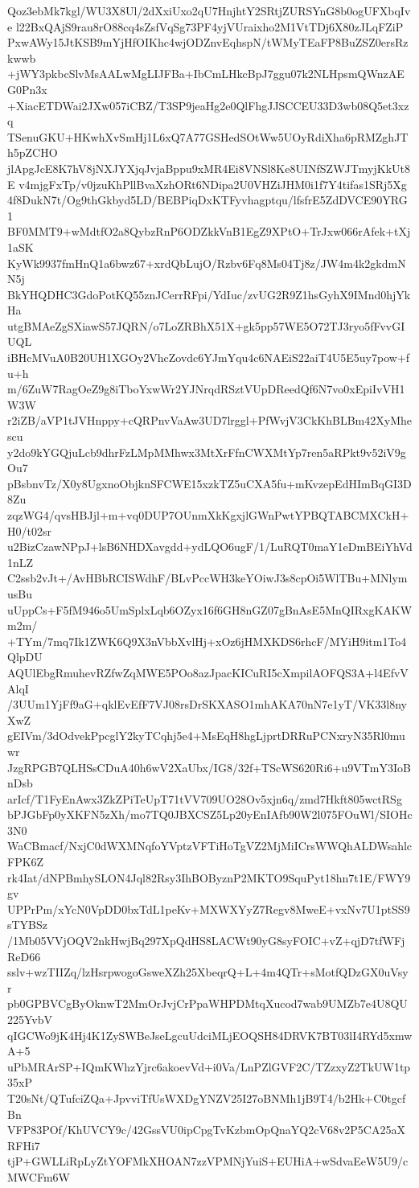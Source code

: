 Qoz3ebMk7kgl/WU3X8Ul/2dXxiUxo2qU7HnjhtY2SRtjZURSYnG8b0ogUFXbqIve
l22BxQAjS9rau8rO88cq4sZsfVqSg73PF4yjVUraixho2M1VtTDj6X80zJLqFZiP
PxwAWy15JtKSB9mYjHfOIKhc4wjODZnvEqhspN/tWMyTEaFP8BuZSZ0ersRzkwwb
+jWY3pkbcSlvMsAALwMgLIJFBa+IbCmLHkcBpJ7ggu07k2NLHpsmQWnzAEG0Pn3x
+XiacETDWai2JXw057iCBZ/T3SP9jeaHg2e0QlFhgJJSCCEU33D3wb08Q5et3xzq
TSenuGKU+HKwhXvSmHj1L6xQ7A77GSHedSOtWw5UOyRdiXha6pRMZghJTh5pZCHO
jlApgJcE8K7hV8jNXJYXjqJvjaBppu9xMR4Ei8VNSl8Ke8UINfSZWJTmyjKkUt8E
v4mjgFxTp/v0jzuKhPllBvaXzhORt6NDipa2U0VHZiJHM0i1f7Y4tifas1SRj5Xg
4f8DukN7t/Og9thGkbyd5LD/BEBPiqDxKTFyvhagptqu/lfsfrE5ZdDVCE90YRG1
BF0MMT9+wMdtfO2a8QybzRnP6ODZkkVnB1EgZ9XPtO+TrJxw066rAfek+tXj1aSK
KyWk9937fmHnQ1a6bwz67+xrdQbLujO/Rzbv6Fq8Ms04Tj8z/JW4m4k2gkdmNN5j
BkYHQDHC3GdoPotKQ55znJCerrRFpi/YdIuc/zvUG2R9Z1hsGyhX9IMnd0hjYkHa
utgBMAeZgSXiawS57JQRN/o7LoZRBhX51X+gk5pp57WE5O72TJ3ryo5fFvvGIUQL
iBHcMVuA0B20UH1XGOy2VhcZovdc6YJmYqu4c6NAEiS22aiT4U5E5uy7pow+fu+h
m/6ZuW7RagOeZ9g8iTboYxwWr2YJNrqdRSztVUpDReedQf6N7vo0xEpiIvVH1W3W
r2iZB/aVP1tJVHnppy+cQRPnvVaAw3UD7lrggl+PfWvjV3CkKhBLBm42XyMhescu
y2do9kYGQjuLcb9dhrFzLMpMMhwx3MtXrFfnCWXMtYp7ren5aRPkt9v52iV9gOu7
pBsbnvTz/X0y8UgxnoObjknSFCWE15xzkTZ5uCXA5fu+mKvzepEdHImBqGI3D8Zu
zqzWG4/qvsHBJjl+m+vq0DUP7OUnmXkKgxjlGWnPwtYPBQTABCMXCkH+H0/t02sr
u2BizCzawNPpJ+lsB6NHDXavgdd+ydLQO6ugF/1/LuRQT0maY1eDmBEiYhVd1nLZ
C2ssb2vJt+/AvHBbRCISWdhF/BLvPccWH3keYOiwJ3s8cpOi5WlTBu+MNlymusBu
uUppCs+F5fM946o5UmSplxLqb6OZyx16f6GH8nGZ07gBnAsE5MnQIRxgKAKWm2m/
+TYm/7mq7Ik1ZWK6Q9X3nVbbXvlHj+xOz6jHMXKDS6rhcF/MYiH9itm1To4QlpDU
AQUlEbgRmuhevRZfwZqMWE5POo8azJpacKICuRI5cXmpilAOFQS3A+l4EfvVAlqI
/3UUm1YjFf9aG+qklEvEfF7VJ08rsDrSKXASO1mhAKA70nN7e1yT/VK33l8nyXwZ
gEIVm/3dOdvekPpcglY2kyTCqhj5e4+MsEqH8hgLjprtDRRuPCNxryN35Rl0muwr
JzgRPGB7QLHSsCDuA40h6wV2XaUbx/IG8/32f+TScWS620Ri6+u9VTmY3IoBnDsb
arIcf/T1FyEnAwx3ZkZPiTeUpT71tVV709UO28Ov5xjn6q/zmd7Hkft805wctRSg
bPJGbFp0yXKFN5zXh/mo7TQ0JBXCSZ5Lp20yEnIAfb90W2l075FOuWl/SIOHc3N0
WaCBmacf/NxjC0dWXMNqfoYVptzVFTiHoTgVZ2MjMiICrsWWQhALDWsahlcFPK6Z
rk4Iat/dNPBmhySLON4Jql82Rsy3IhBOByznP2MKTO9SquPyt18hn7t1E/FWY9gv
UPPrPm/xYcN0VpDD0bxTdL1peKv+MXWXYyZ7Regv8MweE+vxNv7U1ptSS9sTYBSz
/1Mb05VVjOQV2nkHwjBq297XpQdHS8LACWt90yG8syFOIC+vZ+qjD7tfWFjReD66
sslv+wzTIIZq/lzHsrpwogoGsweXZh25XbeqrQ+L+4m4QTr+sMotfQDzGX0uVsyr
pb0GPBVCgByOknwT2MmOrJvjCrPpaWHPDMtqXucod7wab9UMZb7e4U8QU225YvbV
qIGCWo9jK4Hj4K1ZySWBeJseLgcuUdciMLjEOQSH84DRVK7BT03lI4RYd5xmwA+5
uPbMRArSP+IQmKWhzYjrc6akoevVd+i0Va/LnPZlGVF2C/TZzxyZ2TkUW1tp35xP
T20sNt/QTufciZQa+JpvviTfUsWXDgYNZV25I27oBNMh1jB9T4/b2Hk+C0tgcfBn
VFP83POf/KhUVCY9c/42GssVU0ipCpgTvKzbmOpQnaYQ2cV68v2P5CA25aXRFHi7
tjP+GWLLiRpLyZtYOFMkXHOAN7zzVPMNjYuiS+EUHiA+wSdvaEeW5U9/cMWCFm6W
